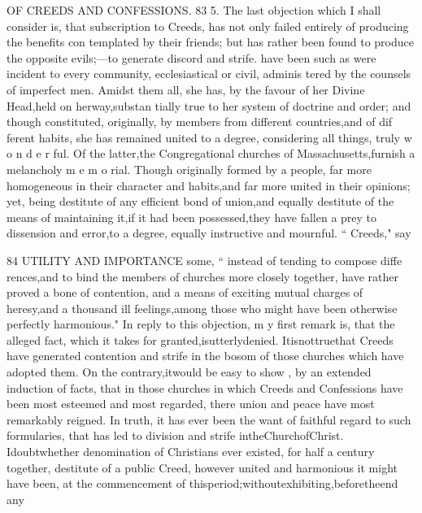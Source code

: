 \documentclass[
]{book}
\begin{document}
OF CREEDS AND CONFESSIONS. 83
5. The last objection which I shall consider is, that subscription to Creeds, has not only failed entirely of producing the benefits con templated by their friends; but has rather been found to produce the opposite evils;---to generate discord and strife.
have been such as were incident to every
community, ecclesiastical or civil, adminis
tered by the counsels of imperfect men.
Amidst them all, she has, by the favour of
her Divine Head,held on herway,substan
tially true to her system of doctrine and
order; and though constituted, originally, by
members from different countries,and of dif
ferent habits, she has remained united to a
degree, considering all things, truly w o n d e r
ful. Of the latter,the Congregational churches
of Massachusetts,furnish a melancholy m e m o
rial. Though originally formed by a people, far more homogeneous in their character and
habits,and far more united in their opinions; yet, being destitute of any efficient bond of
union,and equally destitute of the means of maintaining it,if it had been possessed,they have fallen a prey to dissension and error,to a degree, equally instructive and mournful.
`` Creeds," say

84 UTILITY AND IMPORTANCE
some, `` instead of tending to compose diffe rences,and to bind the members of churches
more closely together, have rather proved a bone of contention, and a means of exciting
mutual charges of heresy,and a thousand ill feelings,among those who might have been
otherwise perfectly harmonious."
In reply to this objection, m y first remark
is, that the alleged fact, which it takes for
granted,isutterlydenied. Itisnottruethat
Creeds have generated contention and strife
in the bosom of those churches which have
adopted them. On the contrary,itwould be easy to show , by an extended induction of
facts, that in those churches in which Creeds and Confessions have been most esteemed and
most regarded, there union and peace have most remarkably reigned. In truth, it has ever been the want of faithful regard to such formularies, that has led to division and strife intheChurchofChrist. Idoubtwhether
denomination of Christians ever existed, for
half a century together, destitute of a public Creed, however united and harmonious it
might have been, at the commencement of thisperiod;withoutexhibiting,beforetheend
any
\end{document}
